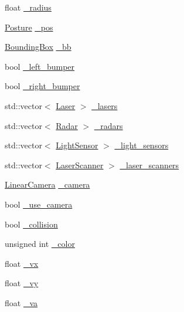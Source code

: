 \begin{DoxyCompactItemize}
\item 
float \hyperlink{classfastsim_1_1_robot_ac8e55bc8fdb6ecbce7830a412a4bf34e}{\+\_\+radius}
\item 
\hyperlink{classfastsim_1_1_posture}{Posture} \hyperlink{classfastsim_1_1_robot_aba7edc6f77474f77df5c6d1028bf9b16}{\+\_\+pos}
\item 
\hyperlink{structfastsim_1_1_robot_1_1_bounding_box}{Bounding\+Box} \hyperlink{classfastsim_1_1_robot_af36edc01e593407ab978a46ddf5ba826}{\+\_\+bb}
\item 
bool \hyperlink{classfastsim_1_1_robot_a9bdb045ad740d8790aa053ccc8324694}{\+\_\+left\+\_\+bumper}
\item 
bool \hyperlink{classfastsim_1_1_robot_a9def1271bb8f65998680ac0059263a2e}{\+\_\+right\+\_\+bumper}
\item 
std\+::vector$<$ \hyperlink{classfastsim_1_1_laser}{Laser} $>$ \hyperlink{classfastsim_1_1_robot_a4ace6b4e6c10e60d823aba7b2524649f}{\+\_\+lasers}
\item 
std\+::vector$<$ \hyperlink{classfastsim_1_1_radar}{Radar} $>$ \hyperlink{classfastsim_1_1_robot_a4f1ad7e0b518104cb6d12214ddc03730}{\+\_\+radars}
\item 
std\+::vector$<$ \hyperlink{classfastsim_1_1_light_sensor}{Light\+Sensor} $>$ \hyperlink{classfastsim_1_1_robot_a0998428cce1ba4cb37ae3c52b872fd92}{\+\_\+light\+\_\+sensors}
\item 
std\+::vector$<$ \hyperlink{classfastsim_1_1_laser_scanner}{Laser\+Scanner} $>$ \hyperlink{classfastsim_1_1_robot_a939bbd34745152e9e1d3afe2c9120f4d}{\+\_\+laser\+\_\+scanners}
\item 
\hyperlink{classfastsim_1_1_linear_camera}{Linear\+Camera} \hyperlink{classfastsim_1_1_robot_afb4408001af6a99ac11ff0ae6402582c}{\+\_\+camera}
\item 
bool \hyperlink{classfastsim_1_1_robot_a8c55febf6b863bd27258800d97ffb1ae}{\+\_\+use\+\_\+camera}
\item 
bool \hyperlink{classfastsim_1_1_robot_a3f0712b649c89ed5f3b028d40c555501}{\+\_\+collision}
\item 
unsigned int \hyperlink{classfastsim_1_1_robot_a7132480c7864f6b49bbe83458edfa270}{\+\_\+color}
\item 
float \hyperlink{classfastsim_1_1_robot_a91147570b2cf4518fdcffa9f80becd46}{\+\_\+vx}
\item 
float \hyperlink{classfastsim_1_1_robot_acd1281de279846f404508c409156b81d}{\+\_\+vy}
\item 
float \hyperlink{classfastsim_1_1_robot_abc9af3f2d17c288870d474e7a57dd953}{\+\_\+va}
\end{DoxyCompactItemize}


